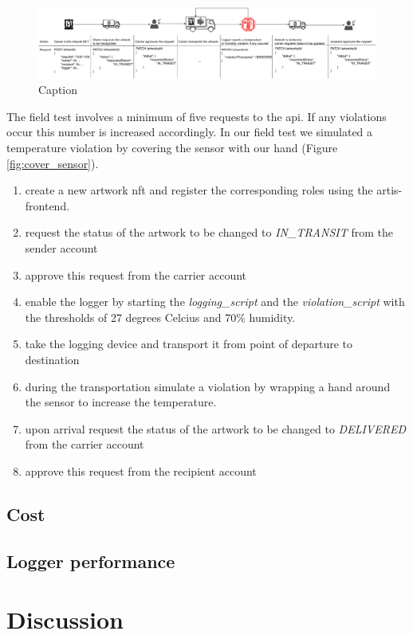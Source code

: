 \begin{figure}
    \centering
    \includegraphics[width=\textwidth]{diagrams/evaluation_scenario.drawio.pdf}
    \caption{Caption}
    \label{fig:eval_scenario}
\end{figure}

The field test involves a minimum of five requests to the \gls{api}. If any violations occur this number is increased accordingly. In our field test we simulated a temperature violation by covering the sensor with our hand (Figure \ref{fig:cover_sensor}).

\begin{enumerate}
    \item create a new artwork \gls{nft} and register the corresponding roles using the artis-frontend.
    \item request the status of the artwork to be changed to \textit{IN\_TRANSIT} from the sender account
    \item approve this request from the carrier account
    \item enable the logger by starting the \textit{logging\_script} and the \textit{violation\_script} with the thresholds of 27 degrees Celcius and 70\% humidity.
    \item take the logging device and transport it from point of departure to destination
    \item during the transportation simulate a violation by wrapping a hand around the sensor to increase the temperature.
    \item upon arrival request the status of the artwork to be changed to \textit{DELIVERED} from the carrier account
    \item approve this request from the recipient account
\end{enumerate}


\subsection{Cost}
\subsection{Logger performance}


\section{Discussion}
\label{sec:eval_discussion}